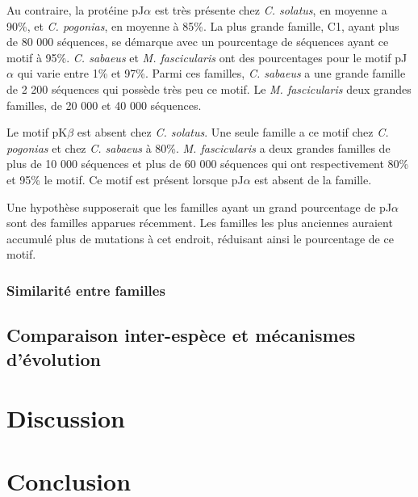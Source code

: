 \documentclass[12pt,a4paper]{article}
\begin{document}
			Au contraire, la protéine pJ$\alpha$ est très présente chez \textit{C. solatus}, en moyenne a 90\%, et \textit{C. pogonias}, en moyenne à 85\%. La plus grande famille, C1, ayant plus de 80 000 séquences, se démarque avec un pourcentage de séquences ayant ce motif à  95\%. \textit{C. sabaeus} et \textit{M. fascicularis} ont des pourcentages pour le motif pJ$\alpha$ qui varie entre 1\% et 97\%. Parmi ces familles, \textit{C. sabaeus} a une grande famille de 2 200 séquences qui possède très peu ce motif. Le \textit{M. fascicularis} deux grandes familles, de 20 000 et 40 000 séquences. 
			
			Le motif pK$\beta$ est absent chez \textit{C. solatus}. Une seule famille a ce motif chez \textit{C. pogonias}  et chez \textit{C. sabaeus} à 80\%. \textit{M. fascicularis} a deux grandes familles de plus de 10 000 séquences et plus de 60 000 séquences qui ont respectivement 80\% et 95\% le motif. Ce motif est présent lorsque pJ$\alpha$ est absent de la famille.
			
			Une hypothèse supposerait que les familles ayant un grand pourcentage de pJ$\alpha$ sont des familles apparues récemment. Les familles les plus anciennes auraient accumulé plus de mutations à cet endroit, réduisant ainsi le pourcentage de ce motif.
			
			\subsubsection{Similarité entre familles}
	
	\subsection{Comparaison inter-espèce et mécanismes d'évolution}


\section{Discussion}
\section{Conclusion}

\newpage
\strut  ~  \mbox{}  \null
\newpage

  

%
% 
%
%
%
% 
% 
\end{document}
